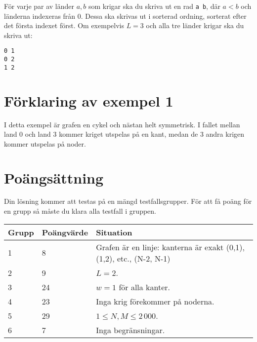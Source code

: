 För varje par av länder $a, b$ som krigar ska du skriva ut en rad \texttt{a b}, där $a < b$ och länderna indexeras från 0.
Dessa ska skrivas ut i sorterad ordning, sorterat efter det första indexet först.
Om exempelvis $L = 3$ och alla tre länder krigar ska du skriva ut:
\begin{lstlisting}
0 1
0 2
1 2
\end{lstlisting}

\section*{Förklaring av exempel 1}

I detta exempel är grafen en cykel och nästan helt symmetrisk. I fallet mellan
land 0 och land 3 kommer kriget utspelas på en kant, medan de 3 andra krigen
kommer utspelas på noder.

\section*{Poängsättning}

Din lösning kommer att testas på en mängd testfallsgrupper. För att få poäng för en grupp
så måste du klara alla testfall i gruppen.

\begin{tabular}{| l | l | l |}
\hline
Grupp & Poängvärde & Situation \\ \hline
1     & 8          & Grafen är en linje: kanterna är exakt (0,1), (1,2), etc., (N-2, N-1) \\ \hline
2     & 9          & $L = 2$. \\ \hline
3     & 24         & $w = 1$ för alla kanter. \\ \hline
4     & 23         & Inga krig förekommer på noderna. \\ \hline
5     & 29         & $1 \le N, M \le 2\,000$. \\ \hline
6     & 7          & Inga begränsningar. \\ \hline
\end{tabular}
